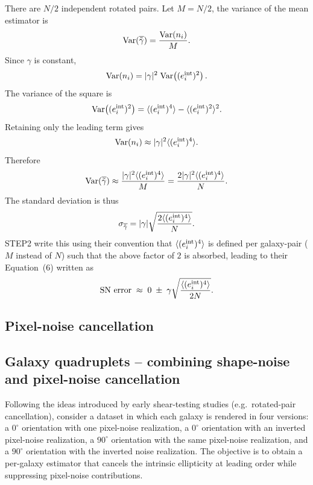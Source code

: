 \documentclass[11pt]{EuclidVIS}
\numberwithin{table}{section}
\numberwithin{figure}{section}
\begin{document}
There are $N/2$ independent rotated pairs.  Let $M = N/2$, the variance of the mean estimator is
\begin{equation}
{\rm Var}(\overline{\tilde\gamma})
    = \frac{{\rm Var}(n_i)}{M}.
\end{equation}
Since $\gamma$ is constant,
\begin{equation}
{\rm Var}(n_i)
    = |\gamma|^2 \;
      {\rm Var}\!\left((e_i^{\rm int})^2\right).
\end{equation}
The variance of the square is
\begin{equation}
{\rm Var}\!\left((e_i^{\rm int})^2\right)
 =
 \langle (e_i^{\rm int})^4\rangle
 -
 \langle (e_i^{\rm int})^2\rangle^2.
\end{equation}
Retaining only the leading term gives
\begin{equation}
{\rm Var}(n_i)
    \approx
    |\gamma|^2 \langle (e_i^{\rm int})^4\rangle.
\end{equation}
Therefore
\begin{equation}
{\rm Var}(\overline{\tilde{\gamma}})
    \approx
    \frac{|\gamma|^2 \langle (e_i^{\rm int})^4\rangle}{M}
    =
    \frac{2 |\gamma|^2 \langle (e_i^{\rm int})^4\rangle}{N}.
\end{equation}
The standard deviation is thus
\begin{equation}
\sigma_{\overline{\tilde{\gamma}}}
    =
    |\gamma|
    \sqrt{
        \frac{2\langle (e_i^{\rm int})^4\rangle}{N}
    }.
\end{equation}
STEP2 write this using their convention that 
$\langle (e_i^{\rm int})^4\rangle$ is defined per galaxy-pair ($M$ instead of $N$) such that
the above factor of $2$ is absorbed, leading to their Equation~(6) written as
\begin{equation}
{\rm SN\ error}
    \;\approx\;
    0 \;\pm\;
    \gamma \sqrt{\frac{\langle (e_i^{\rm int})^4\rangle}{2N}}.
\end{equation}

\subsection{Pixel-noise cancellation}

\subsection{Galaxy quadruplets -- combining shape-noise and pixel-noise cancellation}

Following the ideas introduced by early shear-testing studies 
(e.g.\ rotated-pair cancellation), consider a dataset in which each galaxy
is rendered in four versions:
a $0^\circ$ orientation with one pixel-noise realization,
a $0^\circ$ orientation with an inverted pixel-noise realization,
a $90^\circ$ orientation with the same pixel-noise realization,
and a $90^\circ$ orientation with the inverted noise realization.
The objective is to obtain a per-galaxy estimator that cancels the intrinsic
ellipticity at leading order while suppressing pixel-noise contributions.
\end{document}
